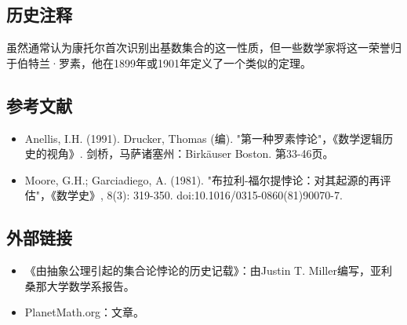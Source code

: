 \subsection{历史注释}
虽然通常认为康托尔首次识别出基数集合的这一性质，但一些数学家将这一荣誉归于伯特兰·罗素，他在1899年或1901年定义了一个类似的定理。
\subsection{参考文献}
\begin{itemize}
\item Anellis, I.H. (1991). Drucker, Thomas (编). "第一种罗素悖论"，《数学逻辑历史的视角》. 剑桥，马萨诸塞州：Birkäuser Boston. 第33-46页。
\item Moore, G.H.; Garciadiego, A. (1981). "布拉利-福尔提悖论：对其起源的再评估"，《数学史》, 8(3): 319-350. doi:10.1016/0315-0860(81)90070-7.
\end{itemize}
\subsection{外部链接}
\begin{itemize}
\item 《由抽象公理引起的集合论悖论的历史记载》：由Justin T. Miller编写，亚利桑那大学数学系报告。
\item PlanetMath.org：文章。
\end{itemize}